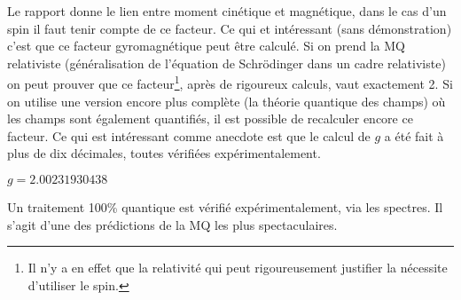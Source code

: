 	Le rapport donne le lien entre moment cinétique et magnétique, dans le 
	cas d'un spin il faut tenir compte de ce facteur. Ce qui et intéressant (sans 
	démonstration) c'est que ce facteur gyromagnétique peut être calculé. Si on 
	prend la MQ relativiste  (généralisation de l'équation de Schrödinger dans un 
	cadre relativiste) on peut prouver que ce facteur\footnote{Il n'y a en effet 
	que la relativité qui peut rigoureusement justifier la nécessite d'utiliser le spin.}, 
	après de rigoureux calculs, vaut exactement 2. Si on utilise une version encore 
	plus complète (la théorie quantique des champs) où les champs sont également quantifiés, 
	il est possible de recalculer encore ce facteur. Ce qui est intéressant comme 
	anecdote est que le calcul de $g$ a été fait à plus de dix décimales, toutes vérifiées 
	expérimentalement.
	\begin{center}
	$g = 2.00231930438$
	\end{center}
	Un traitement 100\% quantique est vérifié expérimentalement, via les spectres. Il 
	s'agit d'une des prédictions de la MQ les plus spectaculaires.
	

